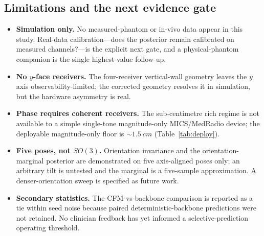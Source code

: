 \subsection{Limitations and the next evidence gate}
\begin{itemize}
\item \textbf{Simulation only.} No measured-phantom or in-vivo data appear in this
study. Real-data calibration---does the posterior remain calibrated on measured
channels?---is the explicit next gate, and a physical-phantom companion is the
single highest-value follow-up.
\item \textbf{No $y$-face receivers.} The four-receiver vertical-wall geometry
leaves the $y$ axis observability-limited; the corrected geometry resolves it in
simulation, but the hardware asymmetry is real.
\item \textbf{Phase requires coherent receivers.} The sub-centimetre rich regime
is not available to a simple single-tone magnitude-only MICS/MedRadio device; the deployable
magnitude-only floor is ${\sim}\SI{1.5}{cm}$ (Table~\ref{tab:deploy}).
\item \textbf{Five poses, not $SO(3)$.} Orientation invariance and the
orientation-marginal posterior are demonstrated on five axis-aligned poses only;
an arbitrary tilt is untested and the marginal is a five-sample approximation. A
denser-orientation sweep is specified as future work.
\item \textbf{Secondary statistics.} The CFM-vs-backbone comparison is reported
as a tie within seed noise because paired deterministic-backbone predictions
were not retained. No clinician feedback has yet informed a selective-prediction
operating threshold.
\end{itemize}
